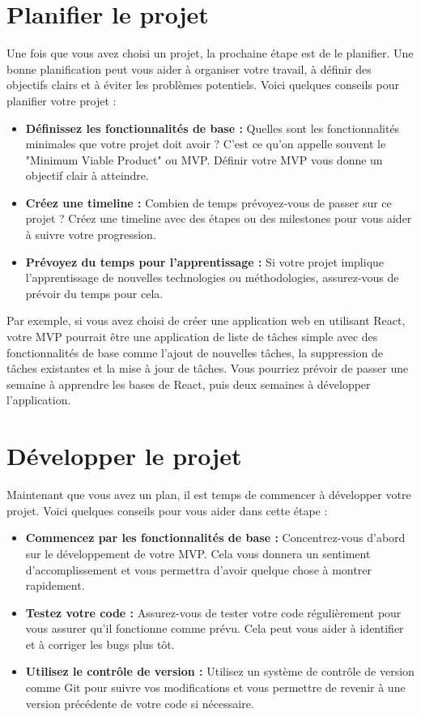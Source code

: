 \section{Planifier le projet}

Une fois que vous avez choisi un projet, la prochaine étape est de le planifier. Une bonne planification peut vous aider à organiser votre travail, à définir des objectifs clairs et à éviter les problèmes potentiels. Voici quelques conseils pour planifier votre projet :

\begin{itemize}
    \item \textbf{Définissez les fonctionnalités de base :} Quelles sont les fonctionnalités minimales que votre projet doit avoir ? C'est ce qu'on appelle souvent le "Minimum Viable Product" ou MVP. Définir votre MVP vous donne un objectif clair à atteindre.
    \item \textbf{Créez une timeline :} Combien de temps prévoyez-vous de passer sur ce projet ? Créez une timeline avec des étapes ou des milestones pour vous aider à suivre votre progression.
    \item \textbf{Prévoyez du temps pour l'apprentissage :} Si votre projet implique l'apprentissage de nouvelles technologies ou méthodologies, assurez-vous de prévoir du temps pour cela.
\end{itemize}

Par exemple, si vous avez choisi de créer une application web en utilisant React, votre MVP pourrait être une application de liste de tâches simple avec des fonctionnalités de base comme l'ajout de nouvelles tâches, la suppression de tâches existantes et la mise à jour de tâches. Vous pourriez prévoir de passer une semaine à apprendre les bases de React, puis deux semaines à développer l'application.

\section{Développer le projet}

Maintenant que vous avez un plan, il est temps de commencer à développer votre projet. Voici quelques conseils pour vous aider dans cette étape :

\begin{itemize}
    \item \textbf{Commencez par les fonctionnalités de base :} Concentrez-vous d'abord sur le développement de votre MVP. Cela vous donnera un sentiment d'accomplissement et vous permettra d'avoir quelque chose à montrer rapidement.
    \item \textbf{Testez votre code :} Assurez-vous de tester votre code régulièrement pour vous assurer qu'il fonctionne comme prévu. Cela peut vous aider à identifier et à corriger les bugs plus tôt.
    \item \textbf{Utilisez le contrôle de version :} Utilisez un système de contrôle de version comme Git pour suivre vos modifications et vous permettre de revenir à une version précédente de votre code si nécessaire.
\end{itemize}

